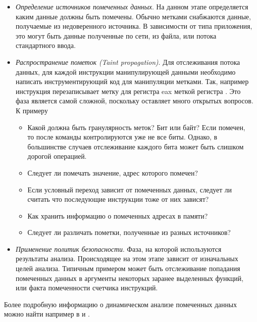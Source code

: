     \begin{itemize}
        \item {\em Определение источников помеченных данных}. На данном этапе определяется каким данные должны быть помечены. Обычно метками снабжаются данные, получаемые из недоверенного
        источника. В зависимости от типа приложения, это могут быть данные полученные по сети, из файла, или потока стандартного ввода.
        \item {\em Распространение пометок (Taint propagation)}. Для отслеживания потока данных, 
        для каждой инструкции манипулирующей данными необходимо написать инструментирующий код для манипуляции метками. Так, например инструкция  перезаписывает метку для регистра eax меткой регистра . Это фаза является самой сложной, поскольку оставляет много открытых вопросов. К примеру
        \begin{itemize}
            \item Какой должна быть гранулярность меток? Бит или байт? Если  помечен, то после команды  контролируются уже не все биты. Однако, в большинстве случаев отслеживание каждого бита может быть слишком дорогой операцией.
            \item Следует ли помечать значение, адрес которого помечен?
            \item Если условный переход зависит от помеченных данных, следует ли считать что последующие инструкции тоже от них зависят?
            \item Как хранить информацию о помеченных адресах в памяти?
            \item Следует ли различать пометки, полученные из разных источников?
        \end{itemize}
        \item {\em Применение политик безопасности}. Фаза, на которой используются результаты анализа. Происходящее на этом этапе зависит от изначальных целей анализа. Типичным примером может быть отслеживание попадания помеченных данных в аргументы некоторых заранее выделенных функций, или факта помеченности счетчика инструкций.
    \end{itemize}

Более подробную информацию о динамическом анализе помеченных данных можно найти например в \cite{Schwartz} и \cite{PBA}.


